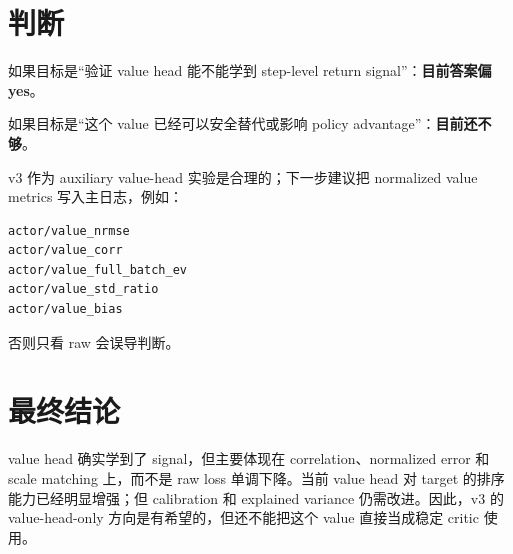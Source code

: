 \documentclass[10pt]{ctexart}
\begin{document}
\section*{判断}
如果目标是“验证 value head 能不能学到 step-level return signal”：\textbf{目前答案偏 yes}。

如果目标是“这个 value 已经可以安全替代或影响 policy advantage”：\textbf{目前还不够}。

v3 作为 auxiliary value-head 实验是合理的；下一步建议把 normalized value metrics 写入主日志，例如：
\begin{lstlisting}
actor/value_nrmse
actor/value_corr
actor/value_full_batch_ev
actor/value_std_ratio
actor/value_bias
\end{lstlisting}

否则只看 raw  会误导判断。

\section*{最终结论}
value head 确实学到了 signal，但主要体现在 correlation、normalized error 和 scale matching 上，而不是 raw loss 单调下降。当前 value head 对 target 的排序能力已经明显增强；但 calibration 和 explained variance 仍需改进。因此，v3 的 value-head-only 方向是有希望的，但还不能把这个 value 直接当成稳定 critic 使用。
\end{document}
